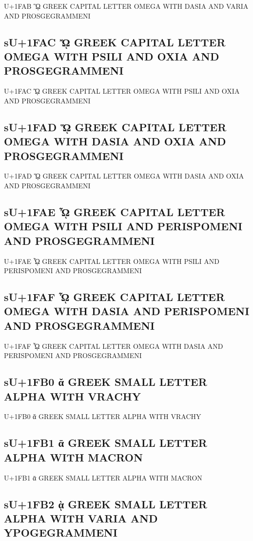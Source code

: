 U+1FAB ᾫ GREEK CAPITAL LETTER OMEGA WITH DASIA AND VARIA AND PROSGEGRAMMENI

\subsection{sU+1FAC ᾬ GREEK CAPITAL LETTER OMEGA WITH PSILI AND OXIA AND PROSGEGRAMMENI}

U+1FAC ᾬ GREEK CAPITAL LETTER OMEGA WITH PSILI AND OXIA AND PROSGEGRAMMENI

\subsection{sU+1FAD ᾭ GREEK CAPITAL LETTER OMEGA WITH DASIA AND OXIA AND PROSGEGRAMMENI}

U+1FAD ᾭ GREEK CAPITAL LETTER OMEGA WITH DASIA AND OXIA AND PROSGEGRAMMENI

\subsection{sU+1FAE ᾮ GREEK CAPITAL LETTER OMEGA WITH PSILI AND PERISPOMENI AND PROSGEGRAMMENI}

U+1FAE ᾮ GREEK CAPITAL LETTER OMEGA WITH PSILI AND PERISPOMENI AND PROSGEGRAMMENI

\subsection{sU+1FAF ᾯ GREEK CAPITAL LETTER OMEGA WITH DASIA AND PERISPOMENI AND PROSGEGRAMMENI}

U+1FAF ᾯ GREEK CAPITAL LETTER OMEGA WITH DASIA AND PERISPOMENI AND PROSGEGRAMMENI

\subsection{sU+1FB0 ᾰ GREEK SMALL LETTER ALPHA WITH VRACHY}

U+1FB0 ᾰ GREEK SMALL LETTER ALPHA WITH VRACHY

\subsection{sU+1FB1 ᾱ GREEK SMALL LETTER ALPHA WITH MACRON}

U+1FB1 ᾱ GREEK SMALL LETTER ALPHA WITH MACRON

\subsection{sU+1FB2 ᾲ GREEK SMALL LETTER ALPHA WITH VARIA AND YPOGEGRAMMENI}

